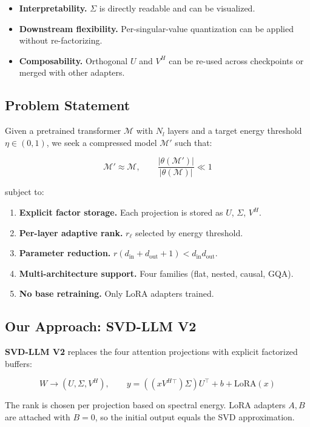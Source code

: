 \begin{itemize}
\item \textbf{Interpretability.} $\Sigma$ is directly readable and can be visualized.
\item \textbf{Downstream flexibility.} Per-singular-value quantization can be applied
  without re-factorizing.
\item \textbf{Composability.} Orthogonal $U$ and $V^H$ can be re-used across
  checkpoints or merged with other adapters.

\end{itemize}
\subsection{Problem Statement}

Given a pretrained transformer $\mathcal{M}$ with $N_l$ layers and a target 
energy threshold $\eta \in (0, 1)$, we seek a compressed model 
$\mathcal{M}'$ such that:

\[
\mathcal{M}' \approx \mathcal{M}, \qquad
\frac{|\theta(\mathcal{M}')|}{|\theta(\mathcal{M})|} \ll 1
\tag{1.2}
\]

subject to:

\begin{enumerate}
\item \textbf{Explicit factor storage.} Each projection is stored as $U$, $\Sigma$, $V^H$.
\item \textbf{Per-layer adaptive rank.} $r_\ell$ selected by energy threshold.
\item \textbf{Parameter reduction.} $r(d_\text{in} + d_\text{out} + 1) < d_\text{in} d_\text{out}$.
\item \textbf{Multi-architecture support.} Four families (flat, nested, causal, GQA).
\item \textbf{No base retraining.} Only LoRA adapters trained.

\end{enumerate}
\subsection{Our Approach: SVD-LLM V2}

\textbf{SVD-LLM V2} replaces the four attention projections with explicit 
factorized buffers:

\[
W \to (U, \Sigma, V^H), \qquad
y = ((x V^H{}^\top) \Sigma) U^\top + b + \text{LoRA}(x)
\tag{1.3}
\]

The rank is chosen per projection based on spectral energy. LoRA adapters 
$A, B$ are attached with $B = 0$, so the initial output equals the SVD 
approximation.

